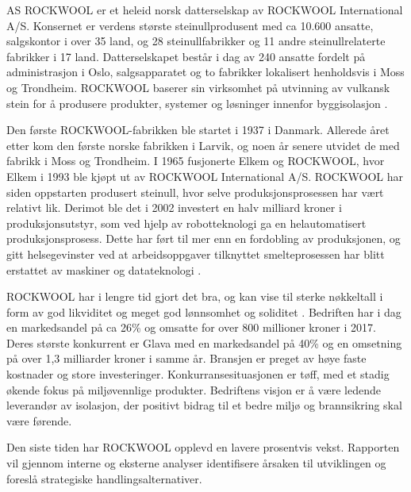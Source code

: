 AS ROCKWOOL er et heleid norsk datterselskap av ROCKWOOL International A/S. Konsernet er verdens største steinullprodusent med ca 10.600 ansatte, salgskontor i over 35 land, og 28 steinullfabrikker og 11 andre steinullrelaterte fabrikker i 17 land. Datterselskapet består i dag av 240 ansatte fordelt på administrasjon i Oslo, salgsapparatet og to fabrikker lokalisert henholdsvis i Moss og Trondheim. ROCKWOOL baserer sin virksomhet på utvinning av vulkansk stein for å produsere produkter, systemer og løsninger innenfor byggisolasjon \cite{omOss}. 

\indent \newline
Den første ROCKWOOL-fabrikken ble startet i 1937 i Danmark. Allerede året etter kom den første norske fabrikken i Larvik, og noen år senere utvidet de med fabrikk i Moss og Trondheim. I 1965 fusjonerte Elkem og ROCKWOOL, hvor Elkem i 1993 ble kjøpt ut av ROCKWOOL International A/S. ROCKWOOL har siden oppstarten produsert steinull, hvor selve produksjonsprosessen har vært relativt lik. Derimot ble det i 2002 investert en halv milliard kroner i produksjonsutstyr, som ved hjelp av robotteknologi ga en helautomatisert produksjonsprosess. Dette har ført til mer enn en fordobling av produksjonen, og gitt helsegevinster ved at arbeidsoppgaver tilknyttet smelteprosessen har blitt erstattet av maskiner og datateknologi \cite{DagsavisenMoss}.

\indent \newline
ROCKWOOL har i lengre tid gjort det bra, og kan vise til sterke nøkkeltall i form av god likviditet og meget god lønnsomhet og soliditet \cite{ProffNokkeltall}. Bedriften har i dag en markedsandel på ca 26\% og omsatte for over 800 millioner kroner i 2017. Deres største konkurrent er Glava med en markedsandel på 40\% og en omsetning på over 1,3 milliarder kroner i samme år. Bransjen er preget av høye faste kostnader og store investeringer. Konkurransesituasjonen er tøff, med et stadig økende fokus på miljøvennlige produkter. Bedriftens visjon er å være ledende leverandør av isolasjon, der positivt bidrag til et bedre miljø og brannsikring skal være førende.

\indent \newline
Den siste tiden har ROCKWOOL opplevd en lavere prosentvis vekst. Rapporten vil gjennom interne og eksterne analyser identifisere årsaken til utviklingen og foreslå strategiske handlingsalternativer.

